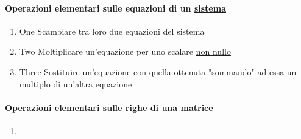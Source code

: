 \documentclass{article}
\newcommand{\ul}[1]{\underline{#1}}
\begin{document}
\paragraph*{Operazioni elementari sulle equazioni di un \ul{sistema}}
\begin{enumerate}[label=\Roman*.]
	\item One Scambiare tra loro due equazioni del sistema
	\item Two Moltiplicare un'equazione per uno scalare \ul{non nullo}
	\item Three Sostituire un'equazione con quella ottenuta "sommando" ad essa un multiplo di un'altra equazione
\end{enumerate}

\paragraph*{Operazioni elementari sulle righe di una \ul{matrice}}
\begin{enumerate}
	\item
\end{enumerate}
\end{document}
